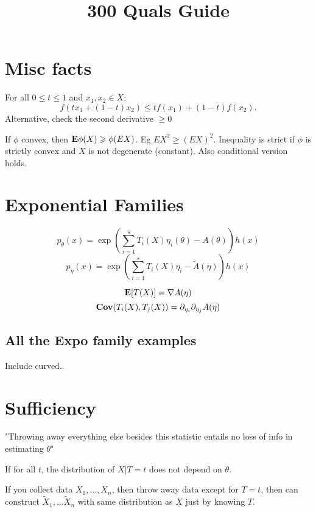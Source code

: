 \documentclass{article}
\title{300 Quals Guide}
\begin{document}
\maketitle
\section{Misc facts}
\begin{definition}[Convexity]
For all $0\leq t\leq 1$ and $x_1,x_2 \in X$:
$$f(tx_1 + (1-t)x_2) \leq tf(x_1) + (1-t) f(x_2).$$
Alternative, check the second derivative $\geq 0$
\end{definition}
\begin{theorem}
If $\phi$ convex, then $\mathbf{E} \phi(X) \geqslant \phi(EX)$. Eg $EX^2 \geq (EX)^2$. Inequality is strict if $\phi$ is strictly convex and $X$ is not degenerate (constant). Also conditional version holds. 
\end{theorem}
\section{Exponential Families}
\begin{definition}
	$$p_\theta(x) = \exp(\sum_{i=1}^s T_i(X) \eta_i(\theta) - A(\theta))h(x)$$
	$$p_\eta(x) = \exp(\sum_{i=1}^s T_i(X) \eta_i - \tilde A(\eta)) h(x)$$
\end{definition}
\begin{fact}[$E[T(X)$, $Cov(T(X))$]
$$\mathbf{E}[T(X)] = \nabla A(\eta)$$
$$\mathbf{Cov} (T_i(X), T_j(X)) = \partial_{\eta_i} \partial_{\eta_j} A(\eta)$$
\end{fact}

\subsection{All the Expo family examples}

Include curved.. 


\section{Sufficiency} 
"Throwing away everything else besides this statistic entails no loss of info in estimating $\theta$"
\begin{definition}[Sufficiency]
If for all $t$, the distribution of $X|T=t$ does not depend on $\theta$.
\end{definition}
If you collect data $X_1,\ldots,X_n$, then throw away data except for $T=t$, then can construct $\tilde X_1,\ldots \tilde X_n$ with same distribution as $\underline{X}$ just by knowing $T$.
\end{document}
